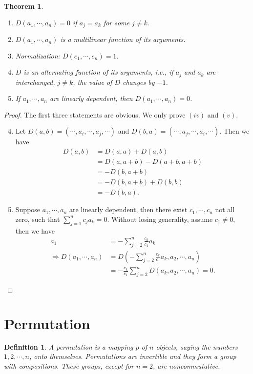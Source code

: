 \documentclass[11pt]{book}
\newtheorem{definition}{Definition}[section]
\newtheorem{theorem}{Theorem}[section]
\theoremstyle{definition}
\numberwithin{equation}{chapter}
\begin{document}
\begin{theorem}\label{determinant}
~\begin{enumerate}[label=(\alph*)]
    \item $D(a_1,\cdots,a_n) = 0$ if $a_j = a_k$ for some $j\neq k$.
    \item $D(a_1,\cdots,a_n)$ is a multilinear function of its arguments.
    \item Normalization: $D(e_1,\cdots,e_n) = 1$.
    \item $D$ is an alternating function of its arguments, i.e., if $a_j$ and $a_k$ are interchanged, $j\neq k$, the value of $D$ changes by $-1$.
    \item If $a_1,\cdots,a_n$ are linearly dependent, then $D(a_1,\cdots,a_n) = 0$.
\end{enumerate}
\end{theorem}
\begin{proof}
The first three statements are obvious. We only prove $(iv)$ and $(v)$.
\begin{enumerate}[label=(\alph*)]
    \setcounter{enumi}{3}
    \item Let $D(a,b) = (\cdots,a_i,\cdots,a_j,\cdots)$ and $D(b,a) = (\cdots,a_j,\cdots,a_i,\cdots)$. Then we have
    \begin{align*}
        D(a,b) & = D(a,a) + D(a,b) \\
        & = D(a,a+b) - D(a+b, a+b) \\
        & = - D(b, a+b) \\
        & = - D(b, a+b) + D(b,b)\\
        & = -D(b,a).
    \end{align*}
    \item Suppose $a_1,\cdots,a_n$ are linearly dependent, then there exist $c_1,\cdots,c_n$ not all zero, such that $\sum^n_{j=1}c_j a_k = 0$. Without losing generality, assume $c_1\neq 0$, then we have
    \begin{align*}
        a_1 & = -\sum^n_{j=2}\frac{c_k}{c_1}a_k \\
        \Rightarrow D(a_1,\cdots,a_n) & = D\left(-\sum^n_{j=2}\frac{c_k}{c_1}a_k, a_2,\cdots,a_n\right) \\
        & = -\frac{c_k}{c_1} \sum^n_{j=2} D(a_k, a_2, \cdots, a_n) = 0.
    \end{align*}
\end{enumerate}
\end{proof}

\medskip

\section{Permutation}
\begin{definition}
A permutation is a mapping $p$ of $n$ objects, saying the numbers $1,2,\cdots,n$, onto themselves. Permutations are invertible
and they form a group with compositions. These groups, except for $n = 2$, are noncommutative.
\end{definition}
\end{document}
